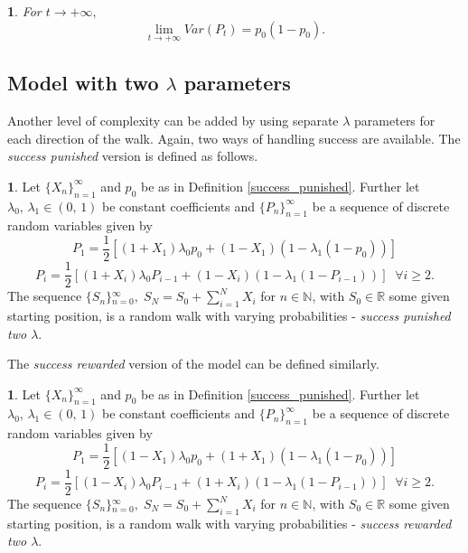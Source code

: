 \documentclass{amsart}
\theoremstyle{definition}
\newtheorem{defn}[thm]{\protect\definitionname}
\theoremstyle{plain}
\theoremstyle{plain}
\newtheorem{cor}[thm]{\protect\corollaryname}
\theoremstyle{plain}
\numberwithin{equation}{section}
\providecommand{\corollaryname}{Corollary}
\providecommand{\definitionname}{Definition}
\begin{document}
\begin{cor}
For $t\rightarrow+\infty,$ \textup{
\[
\lim_{t\to+\infty}Var(P_{t})=p_{0}(1-p_{0}).
\]
}
\end{cor}

\subsection{Model with two $\lambda$ parameters}

Another level of complexity can be added by using separate $\lambda$
parameters for each direction of the walk. Again, two ways of handling
success are available. The \emph{success punished} version is defined
as follows.

\begin{defn}
\label{2lambdas}Let ${\{X_{n}\}}_{n=1}^{\infty}$ and $p_{0}$ be
as in Definition \ref{success_punished}. Further let $\lambda_{0},\,\lambda_{1}\in(0,\,1)$
be constant coefficients and ${\{P_{n}\}}_{n=1}^{\infty}$ be a sequence
of discrete random variables given by
\begin{equation}
P_{1}=\frac{1}{2}[(1+X_{1})\lambda_{0}p_{0}+(1-X_{1})(1-\lambda_{1}(1-p_{0}))]\label{eq:P!1_def-1-1}
\end{equation}
\begin{equation}
P_{i}=\frac{1}{2}[(1+X_{i})\lambda_{0}P_{i-1}+(1-X_{i})(1-\lambda_{1}(1-P_{i-1}))]\;\;\forall i\geq2.\label{eq:Pi_def-1-1}
\end{equation}
The sequence ${\{S_{n}\}}{}_{n=0}^{\infty},\;S_{N}=S_{0}+\sum_{i=1}^{N}X_{i}$
for $n\in\mathbb{N}$, with $S_{0}\in\mathbb{R}$ some given starting
position, is a random walk with varying probabilities - \emph{success
punished two $\lambda$}.
\end{defn}

The \emph{success rewarded} version of the model can be defined similarly.

\begin{defn}
\label{2lambdas-reward}Let ${\{X_{n}\}}_{n=1}^{\infty}$ and $p_{0}$
be as in Definition \ref{success_punished}. Further let $\lambda_{0},\,\lambda_{1}\in(0,\,1)$
be constant coefficients and ${\{P_{n}\}}_{n=1}^{\infty}$ be a sequence
of discrete random variables given by
\[
P_{1}=\frac{1}{2}[(1-X_{1})\lambda_{0}p_{0}+(1+X_{1})(1-\lambda_{1}(1-p_{0}))]
\]
\[
P_{i}=\frac{1}{2}[(1-X_{i})\lambda_{0}P_{i-1}+(1+X_{i})(1-\lambda_{1}(1-P_{i-1}))]\;\;\forall i\geq2.
\]
The sequence ${\{S_{n}\}}{}_{n=0}^{\infty},\;S_{N}=S_{0}+\sum_{i=1}^{N}X_{i}$
for $n\in\mathbb{N}$, with $S_{0}\in\mathbb{R}$ some given starting
position, is a random walk with varying probabilities - \emph{success
rewarded two $\lambda$}.
\end{defn}
\end{document}
